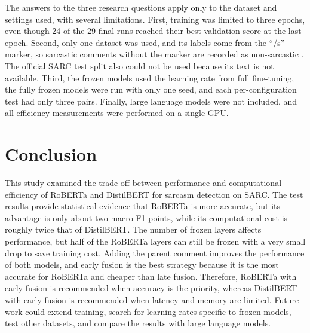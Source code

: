 \documentclass[conference]{IEEEtran}
\begin{document}
The answers to the three research questions apply only to the dataset and settings used, with several limitations. First, training was limited to three epochs, even though 24 of the 29 final runs reached their best validation score at the last epoch. Second, only one dataset was used, and its labels come from the ``/s'' marker, so sarcastic comments without the marker are recorded as non-sarcastic \cite{khodak2018sarc}. The official SARC test split also could not be used because its text is not available. Third, the frozen models used the learning rate from full fine-tuning, the fully frozen models were run with only one seed, and each per-configuration test had only three pairs. Finally, large language models were not included, and all efficiency measurements were performed on a single GPU.

\section{Conclusion}
This study examined the trade-off between performance and computational efficiency of RoBERTa and DistilBERT for sarcasm detection on SARC. The test results provide statistical evidence that RoBERTa is more accurate, but its advantage is only about two macro-F1 points, while its computational cost is roughly twice that of DistilBERT. The number of frozen layers affects performance, but half of the RoBERTa layers can still be frozen with a very small drop to save training cost. Adding the parent comment improves the performance of both models, and early fusion is the best strategy because it is the most accurate for RoBERTa and cheaper than late fusion. Therefore, RoBERTa with early fusion is recommended when accuracy is the priority, whereas DistilBERT with early fusion is recommended when latency and memory are limited. Future work could extend training, search for learning rates specific to frozen models, test other datasets, and compare the results with large language models.



\end{document}
